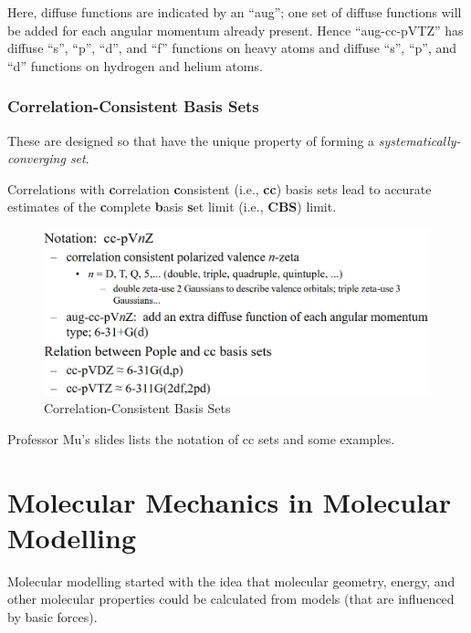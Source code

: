 \documentclass[
  letterpaper,
  DIV=11,
  numbers=noendperiod]{scrreprt}
\begin{document}
Here, diffuse functions are indicated by an ``aug''; one set of diffuse
functions will be added for each angular momentum already present. Hence
``aug-cc-pVTZ'' has diffuse ``s'', ``p'', ``d'', and ``f'' functions on
heavy atoms and diffuse ``s'', ``p'', and ``d'' functions on hydrogen
and helium atoms.

\hypertarget{correlation-consistent-basis-sets}{%
\subsection{Correlation-Consistent Basis
Sets}\label{correlation-consistent-basis-sets}}

These are designed so that have the unique property of forming a
\emph{systematically-converging set}.

Correlations with \textbf{c}orrelation \textbf{c}onsistent (i.e.,
\textbf{cc}) basis sets lead to accurate estimates of the
\textbf{c}omplete \textbf{b}asis \textbf{s}et limit (i.e., \textbf{CBS})
limit.

\begin{figure}

{\centering \includegraphics[width=4.81in,height=\textheight]{./images/wk2a/cc.jpg}

}

\caption{Correlation-Consistent Basis Sets}

\end{figure}

Professor Mu's slides lists the notation of cc sets and some examples.

\hypertarget{molecular-mechanics-in-molecular-modelling}{%
\chapter{Molecular Mechanics in Molecular
Modelling}\label{molecular-mechanics-in-molecular-modelling}}

Molecular modelling started with the idea that molecular geometry,
energy, and other molecular properties could be calculated from models
(that are influenced by basic forces).
\end{document}
